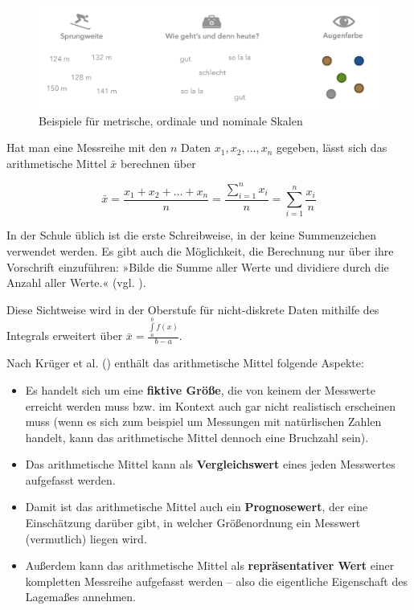 \documentclass[
]{scrbook}
\providecommand{\tightlist}{%
  \setlength{\itemsep}{0pt}\setlength{\parskip}{0pt}}
\theoremstyle{definition}
\theoremstyle{definition}
\theoremstyle{definition}
\theoremstyle{definition}
\theoremstyle{remark}
\begin{document}
\begin{figure}

{\centering \includegraphics[width=0.9\linewidth]{pictures/B-Skalen} 

}

\caption{Beispiele für metrische, ordinale und nominale Skalen}\label{fig:Skalen}
\end{figure}

Hat man eine Messreihe mit den \(n\) Daten \(x_1,x_2,\ldots,x_n\) gegeben, lässt sich das arithmetische Mittel \(\bar{x}\) berechnen über

\[\bar{x} = \frac{x_1+x_2+\ldots + x_n}{n} = \frac{\sum\limits_{i=1}^n x_i}{n} = \sum_{i=1}^n \frac{x_i}{n}\]

In der Schule üblich ist die erste Schreibweise, in der keine Summenzeichen verwendet werden. Es gibt auch die Möglichkeit, die Berechnung nur über ihre Vorschrift einzuführen: »Bilde die Summe aller Werte und dividiere durch die Anzahl aller Werte.« (vgl. ).

Diese Sichtweise wird in der Oberstufe für nicht-diskrete Daten mithilfe des Integrals erweitert über \(\bar{x} = \frac{\int\limits_a^b f(x)}{b-a}\).

Nach Krüger et al. () enthält das arithmetische Mittel folgende Aspekte:

\begin{itemize}
\tightlist
\item
  Es handelt sich um eine \textbf{fiktive Größe}, die von keinem der Messwerte erreicht werden muss bzw. im Kontext auch gar nicht realistisch erscheinen muss (wenn es sich zum beispiel um Messungen mit natürlischen Zahlen handelt, kann das arithmetische Mittel dennoch eine Bruchzahl sein).
\item
  Das arithmetische Mittel kann als \textbf{Vergleichswert} eines jeden Messwertes aufgefasst werden.
\item
  Damit ist das arithmetische Mittel auch ein \textbf{Prognosewert}, der eine Einschätzung darüber gibt, in welcher Größenordnung ein Messwert (vermutlich) liegen wird.
\item
  Außerdem kann das arithmetische Mittel als \textbf{repräsentativer Wert} einer kompletten Messreihe aufgefasst werden -- also die eigentliche Eigenschaft des Lagemaßes annehmen.
\end{itemize}
\end{document}
